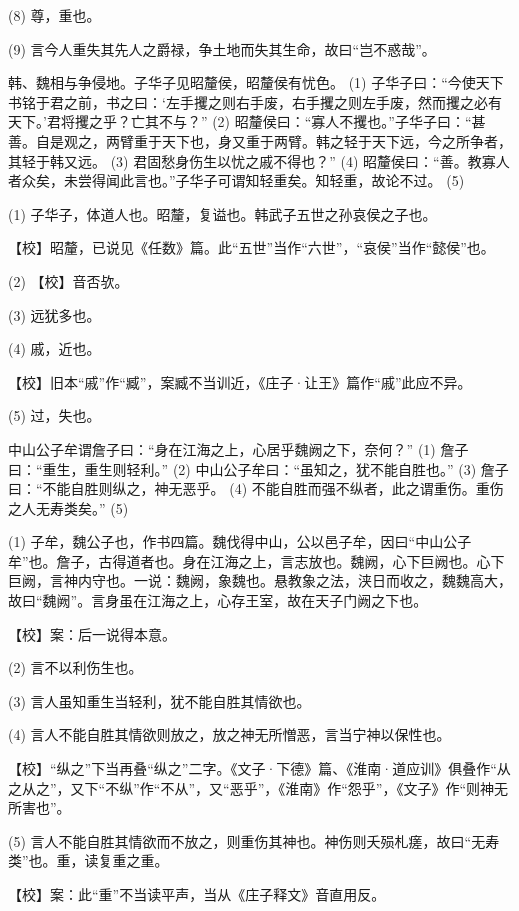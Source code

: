 \documentclass[12pt,UTF8]{ctexbook}
\begin{document}
(8) 尊，重也。

(9) 言今人重失其先人之爵禄，争土地而失其生命，故曰“岂不惑哉”。

韩、魏相与争侵地。子华子见昭釐侯，昭釐侯有忧色。 (1) 子华子曰：“今使天下书铭于君之前，书之曰：‘左手攫之则右手废，右手攫之则左手废，然而攫之必有天下。’君将攫之乎？亡其不与？” (2) 昭釐侯曰：“寡人不攫也。”子华子曰：“甚善。自是观之，两臂重于天下也，身又重于两臂。韩之轻于天下远，今之所争者，其轻于韩又远。 (3) 君固愁身伤生以忧之戚不得也？” (4) 昭釐侯曰：“善。教寡人者众矣，未尝得闻此言也。”子华子可谓知轻重矣。知轻重，故论不过。 (5)

(1) 子华子，体道人也。昭釐，复谥也。韩武子五世之孙哀侯之子也。

【校】昭釐，已说见《任数》篇。此“五世”当作“六世”，“哀侯”当作“懿侯”也。

(2) 【校】音否欤。

(3) 远犹多也。

(4) 戚，近也。

【校】旧本“戚”作“臧”，案臧不当训近，《庄子·让王》篇作“戚”此应不异。

(5) 过，失也。

中山公子牟谓詹子曰：“身在江海之上，心居乎魏阙之下，奈何？” (1) 詹子曰：“重生，重生则轻利。” (2) 中山公子牟曰：“虽知之，犹不能自胜也。” (3) 詹子曰：“不能自胜则纵之，神无恶乎。 (4) 不能自胜而强不纵者，此之谓重伤。重伤之人无寿类矣。” (5)

(1) 子牟，魏公子也，作书四篇。魏伐得中山，公以邑子牟，因曰“中山公子牟”也。詹子，古得道者也。身在江海之上，言志放也。魏阙，心下巨阙也。心下巨阙，言神内守也。一说：魏阙，象魏也。悬教象之法，浃日而收之，魏魏高大，故曰“魏阙”。言身虽在江海之上，心存王室，故在天子门阙之下也。

【校】案：后一说得本意。

(2) 言不以利伤生也。

(3) 言人虽知重生当轻利，犹不能自胜其情欲也。

(4) 言人不能自胜其情欲则放之，放之神无所憎恶，言当宁神以保性也。

【校】“纵之”下当再叠“纵之”二字。《文子·下德》篇、《淮南·道应训》俱叠作“从之从之”，又下“不纵”作“不从”，又“恶乎”，《淮南》作“怨乎”，《文子》作“则神无所害也”。

(5) 言人不能自胜其情欲而不放之，则重伤其神也。神伤则夭殒札瘥，故曰“无寿类”也。重，读复重之重。

【校】案：此“重”不当读平声，当从《庄子释文》音直用反。
\end{document}
